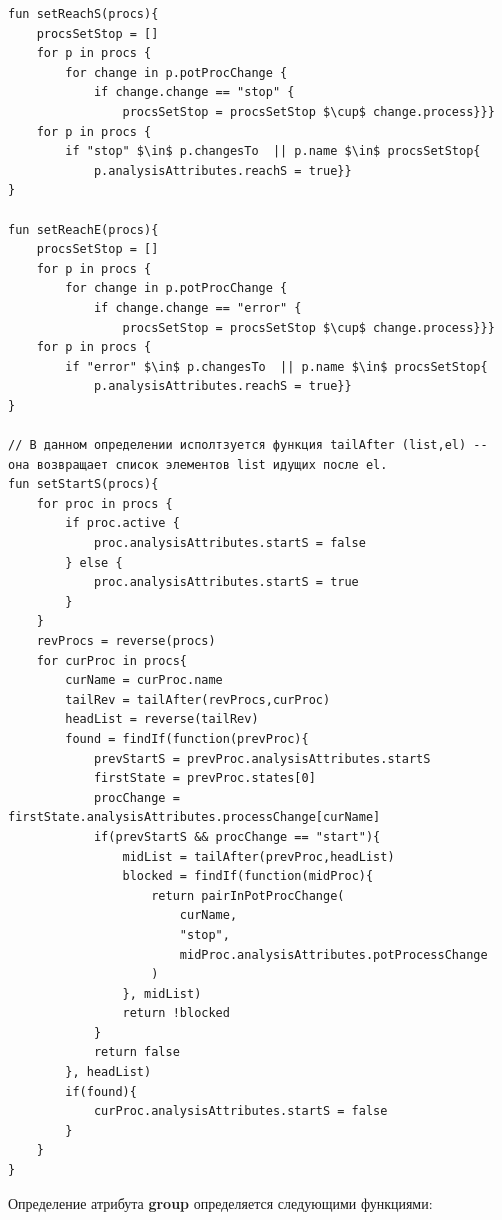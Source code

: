\begin{lstlisting}[style=PseudoStyle,mathescape=true]
fun setReachS(procs){
    procsSetStop = []
    for p in procs {
        for change in p.potProcChange {
            if change.change == "stop" {
                procsSetStop = procsSetStop $\cup$ change.process}}}
    for p in procs {
        if "stop" $\in$ p.changesTo  || p.name $\in$ procsSetStop{
            p.analysisAttributes.reachS = true}}
}

fun setReachE(procs){
    procsSetStop = []
    for p in procs {
        for change in p.potProcChange {
            if change.change == "error" {
                procsSetStop = procsSetStop $\cup$ change.process}}}
    for p in procs {
        if "error" $\in$ p.changesTo  || p.name $\in$ procsSetStop{
            p.analysisAttributes.reachS = true}}
}

// В данном определении исполтзуется функция tailAfter (list,el) -- она возвращает список элементов list идущих после el.
fun setStartS(procs){
    for proc in procs {
        if proc.active {
            proc.analysisAttributes.startS = false
        } else {
            proc.analysisAttributes.startS = true
        }
    }
    revProcs = reverse(procs)
    for curProc in procs{
        curName = curProc.name
        tailRev = tailAfter(revProcs,curProc)
        headList = reverse(tailRev)
        found = findIf(function(prevProc){
            prevStartS = prevProc.analysisAttributes.startS
            firstState = prevProc.states[0]
            procChange = firstState.analysisAttributes.processChange[curName]
            if(prevStartS && procChange == "start"){
                midList = tailAfter(prevProc,headList)
                blocked = findIf(function(midProc){
                    return pairInPotProcChange(
                        curName,
                        "stop",
                        midProc.analysisAttributes.potProcessChange
                    )
                }, midList)
                return !blocked
            }
            return false
        }, headList)
        if(found){
            curProc.analysisAttributes.startS = false
        }
    }
} 
\end{lstlisting}

Определение атрибута \textbf{group} определяется следующими функциями:

